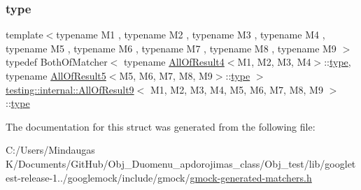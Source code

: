 \subsubsection{\texorpdfstring{type}{type}}
{\footnotesize\ttfamily template$<$typename M1 , typename M2 , typename M3 , typename M4 , typename M5 , typename M6 , typename M7 , typename M8 , typename M9 $>$ \\
typedef Both\+Of\+Matcher$<$ typename \mbox{\hyperlink{structtesting_1_1internal_1_1_all_of_result4}{All\+Of\+Result4}}$<$M1, M2, M3, M4$>$\+::\mbox{\hyperlink{structtesting_1_1internal_1_1_all_of_result9_ade56e18d2e0b745968b87fc394710edc}{type}}, typename \mbox{\hyperlink{structtesting_1_1internal_1_1_all_of_result5}{All\+Of\+Result5}}$<$M5, M6, M7, M8, M9$>$\+::\mbox{\hyperlink{structtesting_1_1internal_1_1_all_of_result9_ade56e18d2e0b745968b87fc394710edc}{type}} $>$ \mbox{\hyperlink{structtesting_1_1internal_1_1_all_of_result9}{testing\+::internal\+::\+All\+Of\+Result9}}$<$ M1, M2, M3, M4, M5, M6, M7, M8, M9 $>$\+::\mbox{\hyperlink{structtesting_1_1internal_1_1_all_of_result9_ade56e18d2e0b745968b87fc394710edc}{type}}}



The documentation for this struct was generated from the following file\+:\begin{DoxyCompactItemize}
\item 
C\+:/\+Users/\+Mindaugas K/\+Documents/\+Git\+Hub/\+Obj\+\_\+\+Duomenu\+\_\+apdorojimas\+\_\+class/\+Obj\+\_\+test/lib/googletest-\/release-\/1../googlemock/include/gmock/\mbox{\hyperlink{_obj__test_2lib_2googletest-release-1_88_81_2googlemock_2include_2gmock_2gmock-generated-matchers_8h}{gmock-\/generated-\/matchers.\+h}}\end{DoxyCompactItemize}
